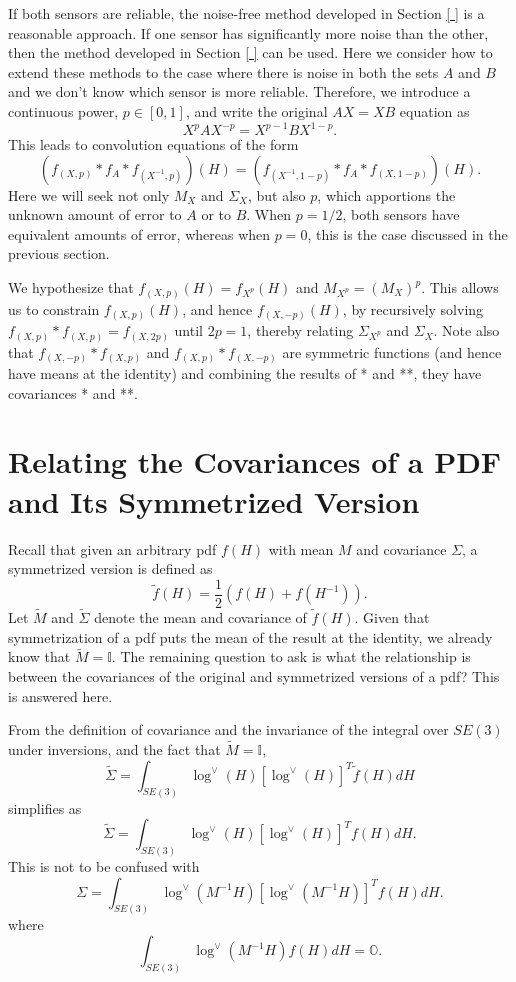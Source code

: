\documentclass[twocolumn,10pt]{asme2ej}
\newcommand{\half}{\frac{1}{2}}
\begin{document}
If both sensors are reliable, the noise-free method developed in Section \ref{ } is a reasonable approach.
If one sensor has significantly more noise than the other, then the method developed in Section \ref{ } can be used.
Here we consider how to extend these methods to the case where there is noise in both the sets $A$ and $B$ and we don't
know which sensor is more reliable. Therefore, we introduce a continuous power, $p \in [0,1]$, and write the original $AX=XB$ equation
as
$$ X^p A X^{-p} = X^{p-1} B X^{1-p}.$$
This leads to convolution equations of the form
$$ (f_{(X,p)} * f_A * f_{(X^{-1},p)})(H) = (f_{(X^{-1},1-p)} * f_A * f_{(X,1-p)})(H). $$
Here we will seek not only $M_X$ and $\Sigma_X$, but also $p$, which apportions the unknown amount of error to $A$ or to $B$.
When $p=1/2$, both sensors have equivalent amounts of error, whereas when $p=0$, this is the case discussed in the previous section.

We hypothesize that $f_{(X,p)}(H) = f_{X^p}(H)$ and $M_{X^p} = (M_X)^p$. This allows us to constrain $f_{(X,p)}(H)$, and hence $f_{(X,-p)}(H)$,
by recursively solving $ f_{(X,p)}*f_{(X,p)} = f_{(X,2p)} $
until $2p=1$, thereby relating $\Sigma_{X^p}$ and $\Sigma_{X}$.
Note also that 
$f_{(X,-p)} * f_{(X, p)}$ and $f_{(X,p)} * f_{(X, -p)}$ are symmetric functions (and hence have means at the identity)
and combining the results of * and **, they have covariances * and **.

\section{Relating the Covariances of a PDF and Its Symmetrized Version}

Recall that given an arbitrary pdf $f(H)$ with mean $M$ and covariance $\Sigma$, a symmetrized version is defined as 
$$ \tilde{f}(H) = \half ({f}(H) + {f}(H^{-1}) ). $$
Let $\tilde{M}$ and $\tilde{\Sigma}$ denote the mean and covariance of $\tilde{f}(H)$. 
Given that symmetrization of a pdf puts the mean of the result at the identity, we already know that $\tilde{M} = \mathbb{I}$.
The remaining question to ask is what the relationship is between the covariances of the original and symmetrized versions of a pdf?
This is answered here.

From the definition of covariance and the invariance of the integral over $SE(3)$ under inversions, and the fact that $\tilde{M} = \mathbb{I}$, 
$$ \tilde{\Sigma} = \int_{SE(3)} \log^{\vee}(H)  [\log^{\vee}(H)]^T \tilde{f}(H) dH $$
simplifies as
$$ \tilde{\Sigma} = \int_{SE(3)} \log^{\vee}(H)  [\log^{\vee}(H)]^T {f}(H) dH. $$
This is not to be confused with
$$ {\Sigma} = \int_{SE(3)} \log^{\vee}(M^{-1} H)  [\log^{\vee}(M^{-1} H)]^T {f}(H) dH. $$
where
$$ \int_{SE(3)} \log^{\vee}(M^{-1} H)  {f}(H) dH = \mathbb{O}. $$
\end{document}
